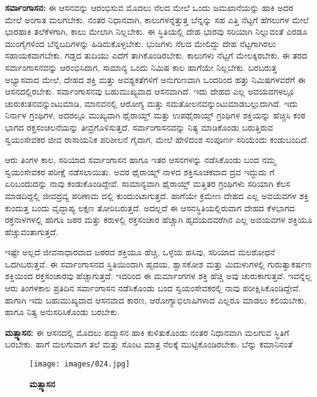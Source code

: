 \textbf{  ಸರ್ವಾಂಗಾಸನ:} ಈ ಆಸನವನ್ನು ಆರಂಭಿಸುವ ಮೊದಲು ನೆಲದ ಮೇಲೆ ಒಂದು ಜಮಖಾನೆಯನ್ನು ಹಾಕಿ ಅದರ ಮೇಲೆ ಅಂಗಾತ ಮಲಗಬೇಕು. ನಂತರ ನಿಧಾನವಾಗಿ, ಕಾಲುಗಳನ್ನೆತ್ತುತ್ತ ಬೆನ್ನನ್ನು ಸಹ ಎತ್ತಿ ನೆಟ್ಟಗೆ ಹೆಗಲುಗಳ ಮೇಲೆ ಭಾರಹಾಕಿ ತಲೆಕೆಳಗಾಗಿ, ಕಾಲು ಮೇಲಾಗಿ ನಿಲ್ಲಬೇಕು. ಈ ಸ್ಥಿತಿಯಲ್ಲಿ ದೇಹ ಭಾರವು ಸರಿಯಾಗಿ ನಿಲ್ಲುವಂತೆ ಎರಡೂ ಮುಂಗೈಗಳಿಂದ ಬೆನ್ನಬದಿಗಳನ್ನು ಹಿಡಿದುಕೊಳ್ಳಬೇಕು. ಭುಜಗಳು ನೆಲದ ಮೇಲಿದ್ದು ದೇಹ ನೆಟ್ಟಗಾಗಿರಲು ಸಹಾಯಕವಾಗಬೇಕು. ಗಡ್ಡದ ತುದಿಯು ಎದೆಗೆ ತಾಗಿಕೊಂಡಿರಬೇಕು. ಕಾಲುಗಳು ನೆಟ್ಟಗೆ ಮೇಲಕ್ಕಿರಬೇಕು. ಈ ತರದ ಸರ್ವಾಂಗಾಸನವನ್ನು ಆರಂಭಿಸಿದಾಗ, ಸಾಮಾನ್ಯ ಒಂದು ನಿಮಿಷ ಕಾಲ ಹಾಗೆಯೇ ನಿಲ್ಲಬೇಕು. ಬರಬರುತ್ತ ಅಭ್ಯಾಸವಾದ ಮೇಲೆ, ದೇಹದ ಶಕ್ತಿ ಮತ್ತು ಅವಶ್ಯಕತೆಗಳಿಗೆ ಅನುಗುಣವಾಗಿ ಒಂದರಿಂದ ಹತ್ತು ನಿಮಿಷಗಳವರೆಗೆ ಈ ಆಸನದಲ್ಲಿರಬೇಕು. ಸರ್ವಾಂಗಾಸನವು ಬಹುಮುಖ್ಯವಾದ ಆಸನವಾಗಿದೆ. ಇದು ದೇಹದ ಎಲ್ಲ ಅವಯವಗಳಲ್ಲೂ ಚುರುಕುತನವನ್ನುಂಟುಮಾಡಿ, ಮಾನವನಲ್ಲಿ ಆರೋಗ್ಯ ಮತ್ತು ಸಮತೋಲನವನ್ನುಂಟುಮಾಡಬಲ್ಲುದಾಗಿದೆ. ಇದು ನಿರ್ನಾಳ ಗ್ರಂಥಿಗಳ, ಅದರಲ್ಲೂ ಮುಖ್ಯವಾಗಿ ಥೈರಾಯ್ಡ್ ಮತ್ತು ಉಪಥೈರಾಯ್ಡ್ ಗ್ರಂಥಿಗಳ ಶಕ್ತಿಯನ್ನು ಹೆಚ್ಚಿಸಿ ಕಂಠ ಭಾಗದ ರಕ್ತಸಂಚಲನೆಯನ್ನು ತೀವ್ರಗೊಳಿಸುತ್ತದೆ. ಸರ್ವಾಂಗಾಸನವನ್ನು ನಿತ್ಯ ಮಾಡಿಕೊಂಡು ಬರುತ್ತಿರುವ ಸ್ವಯಂಸೇವಕರ ಜೀವ ರಾಸಾಯನಿಕ ಪರಿಶೀಲನೆ ಗೈದಾಗ, ಮೇಲೆ ಹೇಳಿದಂಶ ಸಂಪೂರ್ಣ ಸರಿಯೆಂದು ಕಂಡುಬಂದಿದೆ.

ಆರು ತಿಂಗಳ ಕಾಲ, ಸರಿಯಾದ ಸರ್ವಾಂಗಾಸನ ಹಾಗೂ ಇತರ ಆಸನಗಳನ್ನು ನಡೆಸಿಕೊಂಡು ಬಂದ ನಮ್ಮ ಸ್ವಯಂಸೇವಕರ ಪರೀಕ್ಷೆ ನಡೆಸಲಾಯಿತು. ಅವರ ಥೈರಾಯ್ಡ್ ನಾಳದ ಶಕ್ತಿಸೂಚಕವಾದ  ದ್ರವ  ಇದ್ದುದು  ಗೆ ಏರಿಬಂದುದನ್ನು ನಾವು ಕಂಡುಕೊಂಡಿದ್ದೇವೆ. ಸಾಮಾನ್ಯವಾಗಿ ಥೈರಾಯ್ಡ್ ಮತ್ತಿತರ ಗ್ರಂಥಿಗಳು ಸರಿಯಾಗಿ ಕೆಲಸ ಮಾಡದಿದ್ದಲ್ಲಿ ಜೀವದ್ರವ್ಯ ಪರಿಣಾಮ ದಲ್ಲಿ ಕುಂದುಂಟಾಗುತ್ತದೆ. ಹಾಗೆಯೇ ಕ್ರಮೇಣ ದೇಹದ ಎಲ್ಲ ಅವಯವಗಳ ಶಕ್ತಿ ಕುಂದುತ್ತ ಬಂದು ವೃದ್ದಾಪ್ಯ ಲಕ್ಷಣ ತೋರಿಬರುತ್ತದೆ. ಅದಲ್ಲದೆ ಈ ಆಸನಸ್ಥಿತಿಯಲ್ಲಿರುವಾಗ ದೇಹದ ಕೆಳಭಾಗದ ರಕ್ತನಾಳಗಳಲ್ಲಿ ಹಾಗೂ ಜಠರ ಮತ್ತು ಕರುಳಲ್ಲಿ ರಕ್ತಸಂಚಾರ ಹೆಚ್ಚಾಗಿ ಹೃದಯದವರೆಗಿನ ಎಲ್ಲ ಅವಯವಗಳ ಶಕ್ತಿಯೂ ಹೆಚ್ಚುವಂತಾಗುತ್ತದೆ.

ಇಷ್ಟೇ ಅಲ್ಲದೆ ಜೀವನಾಧಾರವಾದ ಜಠರದ ಶಕ್ತಿಯೂ ಹೆಚ್ಚಿ, ಒಳ್ಳೆಯ ಹಸಿವು, ಸರಿಯಾದ ಮಲಶೋಧನೆ ಒದಗಿಬರುತ್ತವೆ. ಈ ಸರ್ವಾಂಗಾಸನದ ಸ್ಥಿತಿಯಿಂದಾಗಿ ಹೃದಯ, ಶ್ವಾಸಕೋಶ ಮತ್ತು ಮಿದುಳುಗಳಲ್ಲಿ ಗುರುತ್ವಾಕರ್ಷಣ ಶಕ್ತಿಯಿಂದ ರಕ್ತಸಂಚಾರವು ಹೆಚ್ಚಾಗುತ್ತದೆ. ಇದರಿಂದ ಈ ಮರ್ಮಾಂಗಗಳ ಶಕ್ತಿ ಹೆಚ್ಚಿ ಅವು ಚುರುಕಾಗುತ್ತವೆ. ಇವನ್ನೆಲ್ಲ ಆರು ತಿಂಗಳಕಾಲ ಪ್ರತಿದಿನ ಸರ್ವಾಂಗಾಸನ ನಡೆಸಿಕೊಂಡು ಬಂದ ಸ್ವಯಂಸೇವಕರಲ್ಲಿ ನಾವು ಪರೀಕ್ಷಿಸಿಕೊಂಡಿದ್ದೇವೆ. ಹಾಗಾಗಿ ಇದು ಬಹುಮುಖ್ಯವಾದ ಆಸನವಾದ ಕಾರಣ, ಆರೋಗ್ಯಾಭಿಲಾಷಿಗಳಾದ ಎಲ್ಲರೂ ಮಾಡಲು ಕಲಿಯಬೇಕು, ಹಾಗೂ ನಿತ್ಯ ಅನುಸರಿಸಿಕೊಂಡು ಬರಬೇಕು.

\textbf{  ಮತ್ಸ್ಯಾಸನ:} ಈ ಆಸನದಲ್ಲಿ ಮೊದಲು ಪದ್ಮಾಸನ ಹಾಕಿ ಕುಳಿತುಕೊಂಡು ನಂತರ ನಿಧಾನವಾಗಿ ಮಲಗುವ ಸ್ಥಿತಿಗೆ ಬರಬೇಕು. ಹಾಗೆ ಮಲಗುವಾಗ ತಲೆ ಮತ್ತು ಸೊಂಟ ಮಾತ್ರ ನೆಲಕ್ಕೆ ಮುಟ್ಟಿಕೊಂಡಿರಬೇಕು. ಬೆನ್ನು ಕಮಾನಿನಂತೆ

\begin{figure}
\texttt{[image: images/024.jpg]}
\caption{\textbf{ಮತ್ಸ್ಯಾಸನ} }
\end{figure}

